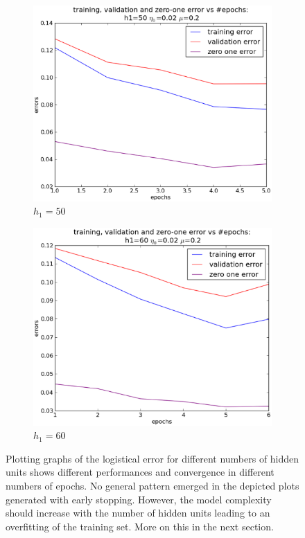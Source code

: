 \begin{itemize}
\begin{figure}[!ht]
		\label{fig:h140}
		\quad
		\begin{subfigure}[b]{.4\textwidth}
		\centering
		\includegraphics[width=\textwidth]{mlp/plots/effects/50h1.eps}
		\caption{$h_1=50$}
		\end{subfigure}	
		\label{fig:h150}
		\begin{subfigure}[b]{.4\textwidth}
		\centering
		\includegraphics[width=\textwidth]{mlp/plots/effects/60h1.eps}
		\caption{$h_1=60$}
		\label{fig:h160}
		\end{subfigure}	
		\caption{Plotting graphs of the logistical error for different numbers of hidden units shows different performances and convergence in different numbers of epochs. No general pattern emerged in the depicted plots generated with early stopping. However, the model complexity should increase with the number of hidden units leading to an overfitting of the training set. More on this in the next section.}
		\label{fig:effects_h1}
		\end{figure}

\end{itemize}


